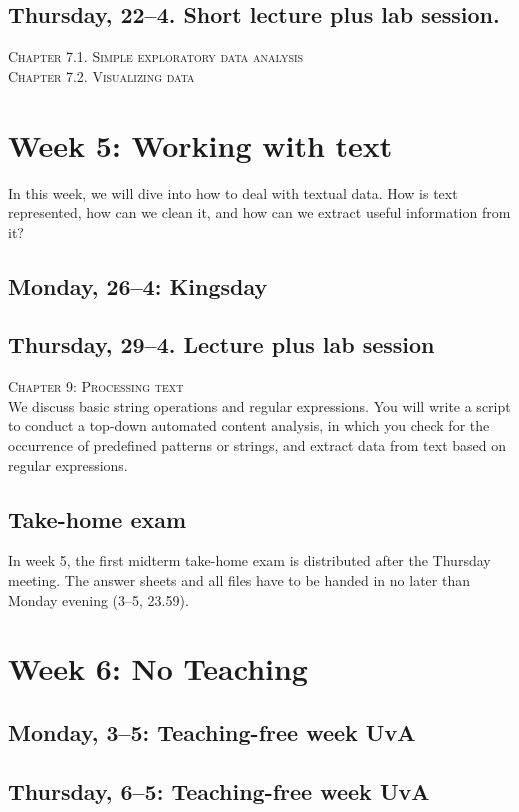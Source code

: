 \subsection*{Thursday, 22--4.  Short lecture plus lab session.}
\textsc{ Chapter 7.1. Simple exploratory data analysis}\\
\textsc{ Chapter 7.2. Visualizing data}\\

\section*{Week 5: Working with text}

In this week, we will dive into how to deal with textual data. How is text represented, how can we clean it, and how can we extract useful information from it?

\subsection*{Monday, 26--4: Kingsday}

\subsection*{Thursday, 29--4. Lecture plus lab session}
\textsc{ Chapter 9: Processing text}\\
We discuss basic string operations and regular expressions. You will write a script to conduct a top-down automated content analysis, in which you check for the occurrence of predefined patterns or strings, and extract data from text based on regular expressions.

\subsection*{Take-home exam}
In week 5, the first midterm take-home exam is distributed after the Thursday meeting. The answer sheets and all files have to be handed in no later than Monday evening (3--5, 23.59).

\section*{Week 6: No Teaching}
\subsection*{Monday, 3--5: Teaching-free week UvA}
\subsection*{Thursday, 6--5: Teaching-free week UvA}


